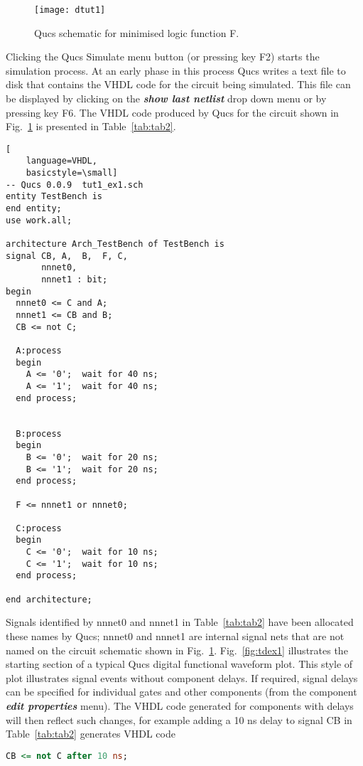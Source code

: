 \begin{figure}[ht]
  \centering
  \texttt{[image: dtut1]}
  \caption{Qucs schematic for minimised logic function F.}
  \label{fig:dtut1}
\end{figure} 


Clicking the Qucs Simulate menu button (or pressing key F2) starts the
simulation process. At an early phase in this process Qucs writes a
text file to disk that contains the VHDL code for the circuit being
simulated.  This file can be displayed by clicking on the
\textit{\textbf{show last netlist}} drop down menu or by pressing key
F6. The VHDL code produced by Qucs for the circuit shown in
Fig.~\ref{fig:dtut1} is presented in Table~\ref{tab:tab2}.

\begin{table}
\begin{lstlisting}[
    language=VHDL,
    basicstyle=\small]
-- Qucs 0.0.9  tut1_ex1.sch
entity TestBench is
end entity;
use work.all;

architecture Arch_TestBench of TestBench is
signal CB, A,  B,  F, C, 
       nnnet0, 
       nnnet1 : bit;
begin
  nnnet0 <= C and A;
  nnnet1 <= CB and B;
  CB <= not C;

  A:process
  begin
    A <= '0';  wait for 40 ns;
    A <= '1';  wait for 40 ns;
  end process;


  B:process
  begin
    B <= '0';  wait for 20 ns;
    B <= '1';  wait for 20 ns;
  end process;

  F <= nnnet1 or nnnet0;

  C:process
  begin
    C <= '0';  wait for 10 ns;
    C <= '1';  wait for 10 ns;
  end process;

end architecture;
\end{lstlisting}
\caption{VHDL code for the circuit shown in Fig.~\ref{fig:dtut1}.}
\label{tab:tab2}
\end{table}

\addvspace{12pt}

Signals identified by nnnet0 and nnnet1 in Table~\ref{tab:tab2} have
been allocated these names by Qucs; nnnet0 and nnnet1 are internal
signal nets that are not named on the circuit schematic shown in
Fig.~\ref{fig:dtut1}.  Fig.~\ref{fig:tdex1} illustrates the starting
section of a typical Qucs digital functional waveform plot.  This
style of plot illustrates signal events without component delays.  If
required, signal delays can be specified for individual gates and
other components (from the component \textbf{\textit{edit properties}}
menu).  The VHDL code generated for components with delays will then
reflect such changes, for example adding a 10 ns delay to signal CB in
Table~\ref{tab:tab2} generates VHDL code
\begin{lstlisting}[language=VHDL]
CB <= not C after 10 ns;
\end{lstlisting}

